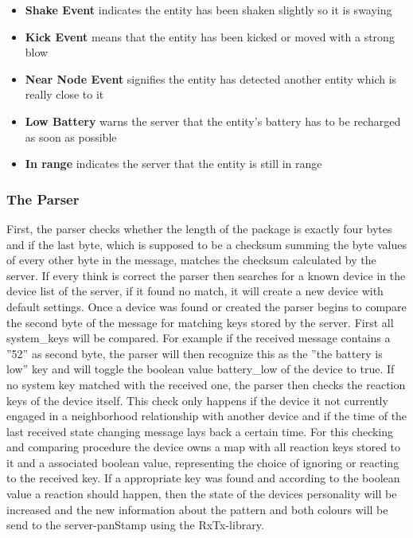 \begin{itemize}
\item \textbf {Shake Event} indicates the entity has been shaken slightly so it is swaying
\item \textbf {Kick Event} means that the entity has been kicked or moved with a strong blow
\item \textbf {Near Node Event} signifies the entity has detected another entity which is really close to it
\item \textbf {Low Battery} warns the server that the entity's battery has to be recharged as soon as possible
\item \textbf {In range} indicates the server that the entity is still in range
\end{itemize}




\subsubsection{The Parser}
 
First, the parser checks whether the length of the package is exactly four bytes and if the last byte, which is supposed to be a checksum summing the byte values of every other byte in the message, matches the checksum calculated by the server. If every think is correct the parser then searches for a known device in the device list of the server, if it found no match, it will create a new device with default settings. Once a device was found or created the parser begins to compare the second byte of the message for matching keys stored by the server. First all system\_keys will be compared. For example if the received message contains a ''52'' as second byte, the parser will then recognize this as the ''the battery is low'' key and will toggle the boolean value battery\_low of the device to true. 
If no system key matched with the received one, the parser then checks the reaction keys of the device itself. This check only happens if the device it not currently engaged in a neighborhood relationship with another device and if the time of the last received state changing message lays back a certain time. For this checking and comparing procedure the device owns a map with all reaction keys stored to it and a associated boolean value, representing the choice of ignoring or reacting to the received key. If a appropriate key was found and according to the boolean value a reaction should happen, then the state of the devices personality will be increased and the new information about the pattern and both colours will be send to the server-panStamp using the RxTx-library.

